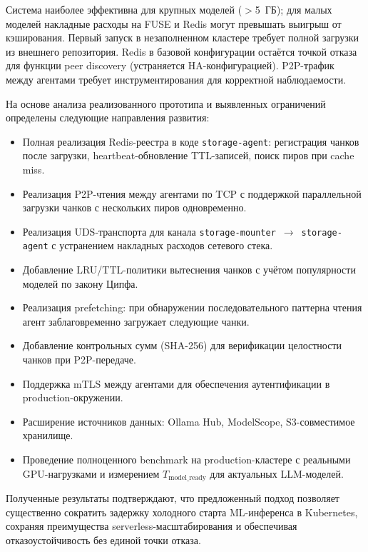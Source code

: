  Система наиболее эффективна для крупных моделей ($>$5~ГБ); для малых моделей накладные расходы на FUSE и Redis могут превышать выигрыш от кэширования. Первый запуск в незаполненном кластере требует полной загрузки из внешнего репозитория. Redis в базовой конфигурации остаётся точкой отказа для функции peer discovery (устраняется HA-конфигурацией). P2P-трафик между агентами требует инструментирования для корректной наблюдаемости.

 На основе анализа реализованного прототипа и выявленных ограничений определены следующие направления развития:

\begin{itemize}[leftmargin=*]
  \item Полная реализация Redis-реестра в коде \texttt{storage-agent}: регистрация чанков после загрузки, heartbeat-обновление TTL-записей, поиск пиров при cache miss.
  \item Реализация P2P-чтения между агентами по TCP с поддержкой параллельной загрузки чанков с нескольких пиров одновременно.
  \item Реализация UDS-транспорта для канала \texttt{storage-mounter}~$\to$~\texttt{storage-agent} с устранением накладных расходов сетевого стека.
  \item Добавление LRU/TTL-политики вытеснения чанков с учётом популярности моделей по закону Ципфа.
  \item Реализация prefetching: при обнаружении последовательного паттерна чтения агент заблаговременно загружает следующие чанки.
  \item Добавление контрольных сумм (SHA-256) для верификации целостности чанков при P2P-передаче.
  \item Поддержка mTLS между агентами для обеспечения аутентификации в production-окружении.
  \item Расширение источников данных: Ollama Hub, ModelScope, S3-совместимое хранилище.
  \item Проведение полноценного benchmark на production-кластере с реальными GPU-нагрузками и измерением $T_{\mathrm{model\_ready}}$ для актуальных LLM-моделей.
\end{itemize}

Полученные результаты подтверждают, что предложенный подход позволяет существенно сократить задержку холодного старта ML-инференса в Kubernetes, сохраняя преимущества serverless-масштабирования и обеспечивая отказоустойчивость без единой точки отказа.
